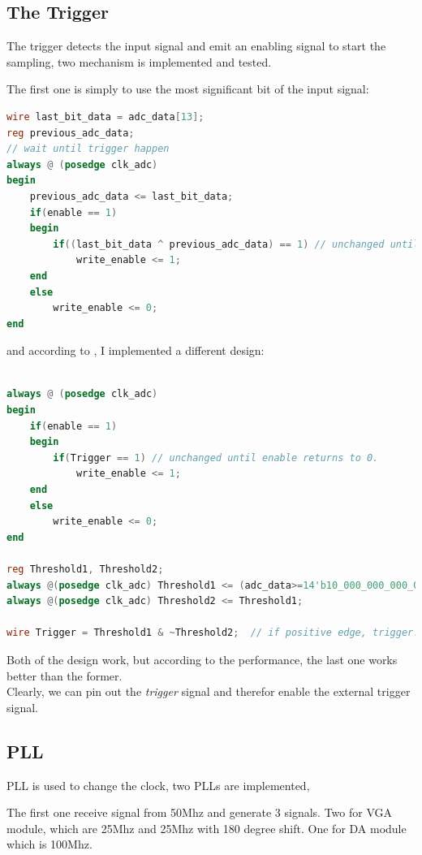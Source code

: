\documentclass[11pt]{scrartcl}
\begin{document}
\subsection{The Trigger}

The trigger detects the input signal and emit an enabling signal to start the sampling, two mechanism is implemented and tested.


The first one is simply to use the most significant bit of the input signal:

\begin{lstlisting}[language=Verilog]
wire last_bit_data = adc_data[13];
reg previous_adc_data;
// wait until trigger happen
always @ (posedge clk_adc)
begin
	previous_adc_data <= last_bit_data;
	if(enable == 1)
	begin
		if((last_bit_data ^ previous_adc_data) == 1) // unchanged until enable returns to 0.
			write_enable <= 1;
	end
	else
		write_enable <= 0;
end
\end{lstlisting}

and according to \cite{trigger}, I implemented a different design:

\begin{lstlisting}[language=Verilog]

always @ (posedge clk_adc)
begin
	if(enable == 1)
	begin
		if(Trigger == 1) // unchanged until enable returns to 0.
			write_enable <= 1;
	end
	else
		write_enable <= 0;
end

reg Threshold1, Threshold2;
always @(posedge clk_adc) Threshold1 <= (adc_data>=14'b10_000_000_000_000);
always @(posedge clk_adc) Threshold2 <= Threshold1;

wire Trigger = Threshold1 & ~Threshold2;  // if positive edge, trigger! 
\end{lstlisting}

Both of the design work, but according to the performance, the last one works better than the former.\\

Clearly, we can pin out the \textit{trigger} signal and therefor enable the external trigger signal.
\subsection{PLL}

PLL is used to change the clock, two PLLs are implemented,

The first one receive signal from 50Mhz and generate 3 signals. Two for VGA module, which are 25Mhz and 25Mhz with 180 degree shift. One for DA module which is 100Mhz.
\end{document}
